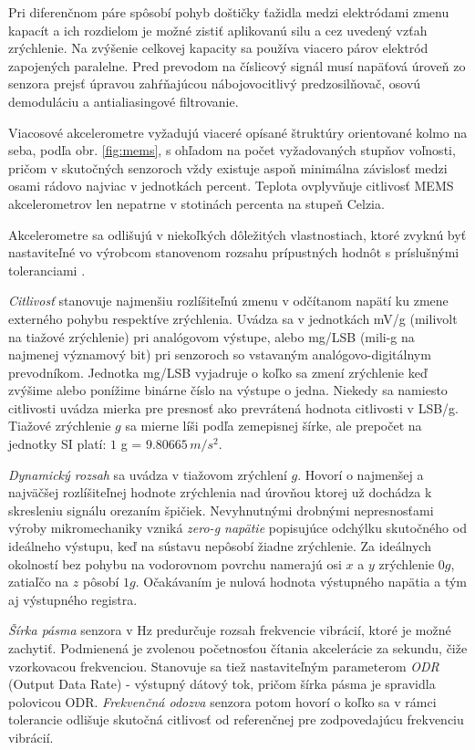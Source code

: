Pri diferenčnom páre spôsobí pohyb doštičky ťažidla medzi elektródami zmenu kapacít a ich rozdielom je možné zistiť aplikovanú silu a
cez uvedený vzťah zrýchlenie. Na zvýšenie celkovej kapacity sa používa viacero párov elektród zapojených paralelne. Pred prevodom na
číslicový signál musí napäťová úroveň zo senzora prejsť úpravou zahŕňajúcou nábojovocitlivý predzosilňovač, osovú demoduláciu a anti\-aliasingové filtrovanie.

Viacosové akcelerometre vyžadujú viaceré opísané štruktúry orientované kolmo na seba, podľa obr. \ref{fig:mems}, s ohľadom na počet
vyžadovaných stupňov voľnosti, pričom v skutočných senzoroch vždy existuje aspoň minimálna závislosť medzi osami rádovo najviac v
jednotkách percent. Teplota ovplyvňuje citlivosť MEMS akcelerometrov len nepatrne v stotinách percenta na stupeň Celzia.

Akcelerometre sa odlišujú v niekoľkých dôležitých vlastnostiach, ktoré zvyknú byť nastaviteľné vo výrobcom stanovenom rozsahu
prípustných hodnôt s príslušnými toleranciami \cite{accelerometer-mechanics}.

\emph{Citlivosť} stanovuje najmenšiu rozlíšiteľnú zmenu v odčítanom napätí ku zmene externého pohybu respektíve zrýchlenia.
Uvádza sa v jednotkách mV/g (milivolt na tiažové zrýchlenie) pri analógovom výstupe, alebo mg/LSB (mili-g
na najmenej významový bit) pri senzoroch so vstavaným analógovo-digitálnym prevodníkom. Jednotka mg/LSB vyjadruje
o koľko sa zmení zrýchlenie keď zvýšime alebo ponížime binárne číslo na výstupe o jedna. Niekedy sa namiesto
citlivosti uvádza mierka pre presnosť ako prevrátená hodnota citlivosti v LSB/g. Tiažové zrýchlenie $g$ sa mierne líši podľa
zemepisnej šírke, ale prepočet na jednotky SI platí: $1$ g = $9.80665\,m/s^2$.

\emph{Dynamický rozsah} sa uvádza v tiažovom  zrýchlení $g$. Hovorí o najmenšej a najväčšej rozlíšiteľnej hodnote zrýchlenia nad
úrovňou ktorej už dochádza k skresleniu signálu orezaním špičiek. Nevyhnutnými drobnými nepresnosťami výroby mikromechaniky vzniká
\emph{zero-g napätie} popisujúce odchýlku skutočného od ideálneho výstupu, keď na sústavu nepôsobí žiadne zrýchlenie. Za ideálnych
okolností bez pohybu na vodorovnom povrchu namerajú osi $x$ a $y$ zrýchlenie $0g$, zatiaľčo na $z$ pôsobí $1g$. Očakávaním je nulová
hodnota výstupného napätia a tým aj výstupného registra.

\emph{Šírka pásma} senzora v Hz predurčuje rozsah frekvencie vibrácií, ktoré je možné zachytiť. Podmienená je zvolenou
početnosťou  čítania akcelerácie za sekundu, čiže vzorkovacou frekvenciou. Stanovuje sa tiež nastaviteľným parameterom \emph{ODR}
(Output Data Rate) - výstupný dátový tok, pričom šírka pásma je spravidla polovicou ODR. \emph{Frekvenčná odozva} senzora potom
hovorí o koľko sa v rámci tolerancie odlišuje skutočná citlivosť od referenčnej pre zodpovedajúcu frekvenciu vibrácií.

